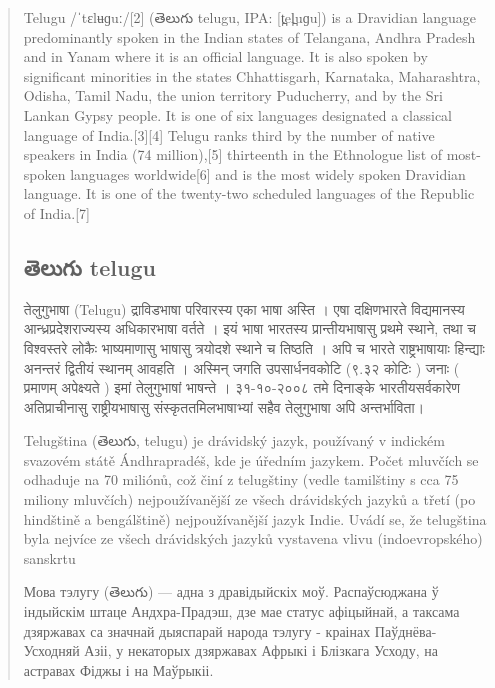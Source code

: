 \begin{quote}
{
Telugu /ˈtɛlʉɡuː/[2] (తెలుగు telugu, IPA: [t̪el̪uɡu]) is a Dravidian language predominantly spoken in the Indian states of Telangana, Andhra Pradesh and in Yanam where it is an official language. It is also spoken by significant minorities in the states Chhattisgarh, Karnataka, Maharashtra, Odisha, Tamil Nadu, the union territory Puducherry, and by the Sri Lankan Gypsy people. It is one of six languages designated a classical language of India.[3][4] Telugu ranks third by the number of native speakers in India (74 million),[5] thirteenth in the Ethnologue list of most-spoken languages worldwide[6] and is the most widely spoken Dravidian language. It is one of the twenty-two scheduled languages of the Republic of India.[7]


\subsection{\protect{}తెలుగు telugu}

तेलुगुभाषा (Telugu) द्राविडभाषा परिवारस्‍य एका भाषा अस्ति । एषा दक्षिणभारते विद्यमानस्य आन्ध्रप्रदेशराज्यस्य अधिकारभाषा वर्तते । इयं भाषा भारतस्य प्रान्तीयभाषासु प्रथमे स्थाने, तथा च विश्वस्तरे लोकैः भाष्यमाणासु भाषासु त्रयोदशे स्थाने च तिष्ठति । अपि च भारते राष्ट्रभाषायाः हिन्द्याः अनन्तरं द्वितीयं स्थानम् आवहति । अस्मिन् जगति उपसार्धनवकोटि (९.३२ कोटिः ) जनाः ( प्रमाणम् अपेक्ष्यते ) इमां तेलुगुभाषां भाषन्ते । ३१-१०-२००८ तमे दिनाङ्के भारतीयसर्वकारेण अतिप्राचीनासु राष्ट्रीयभाषासु संस्कृततमिलभाषाभ्यां सहैव तेलुगुभाषा अपि अन्तर्भाविता।

Telugština (తెలుగు, telugu) je drávidský jazyk, používaný v indickém svazovém státě Ándhrapradéš, kde je úředním jazykem. Počet mluvčích se odhaduje na 70 miliónů, což činí z telugštiny (vedle tamilštiny s cca 75 miliony mluvčích) nejpoužívanější ze všech drávidských jazyků a třetí (po hindštině a bengálštině) nejpoužívanější jazyk Indie. Uvádí se, že telugština byla nejvíce ze všech drávidských jazyků vystavena vlivu (indoevropského) sanskrtu

Мова тэлугу (తెలుగు) — адна з дравідыйскіх моў. Распаўсюджана ў індыйскім штаце Андхра-Прадэш, дзе мае статус афіцыйнай, а таксама дзяржавах са значнай дыяспарай народа тэлугу - краінах Паўднёва-Усходняй Азіі, у некаторых дзяржавах Афрыкі і Блізкага Усходу, на астравах Фіджы і на Маўрыкіі.

}
\end{quote}


